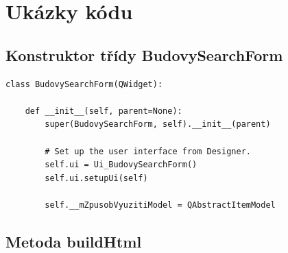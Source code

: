 \documentclass[a4paper,12pt,oneside]{book}
\begin{document}
\newpage
\appendix

\setcounter{page}{1}   	%

\chapter{Ukázky kódu}

\section{Konstruktor třídy BudovySearchForm}

\begin{lstlisting}[style=python, label=l_budovySearchForm_konstruktor]
class BudovySearchForm(QWidget):

    def __init__(self, parent=None):
        super(BudovySearchForm, self).__init__(parent)

        # Set up the user interface from Designer.
        self.ui = Ui_BudovySearchForm()
        self.ui.setupUi(self)

        self.__mZpusobVyuzitiModel = QAbstractItemModel
\end{lstlisting}


\section{Metoda buildHtml}
\end{document}
